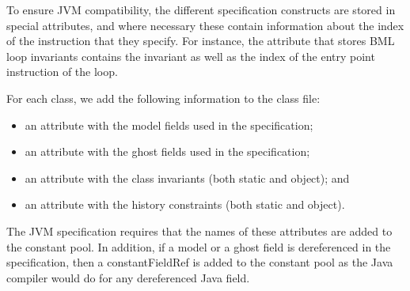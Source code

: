 To ensure JVM compatibility, the different specification constructs
are stored in special attributes, and where necessary these contain
information about the index of the instruction that they specify. For
instance, the attribute that stores BML loop invariants contains the
invariant as well as the index of the entry point instruction of the
loop.

For each class, we add the following information to the class file:
\begin{itemize}
\item an attribute with the model fields used in the specification;
\item an attribute with the ghost fields used in the specification;
\item an attribute with the class invariants (both static and object); and
\item an attribute with the history constraints (both static and object).
\end{itemize}

The JVM specification requires that the names of these attributes are
added to the constant pool.  In addition, if a model or a ghost field
is dereferenced in the specification, then a constantFieldRef is added
to the constant pool as the Java compiler would do for any
dereferenced Java field. %


